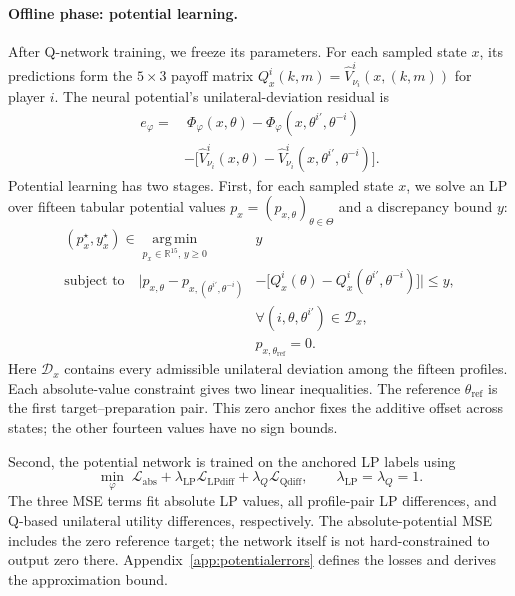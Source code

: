 \documentclass[pmlr]{jmlr}
\newcommand{\R}{\mathbb{R}}
\begin{document}
\paragraph{Offline phase: potential learning.}
After Q-network training, we freeze its parameters. For each sampled state $x$, its predictions form the $5\times3$ payoff matrix $Q_x^i(k,m)=\widehat V^i_{\nu_i}(x,(k,m))$ for player $i$. The neural potential's unilateral-deviation residual is
\begin{equation}
\begin{split}
 e_\varphi=&\ \Phi_\varphi(x,\theta)
       -\Phi_\varphi(x,\theta^{i\prime},\theta^{-i})\\
       &-\big[\widehat V^i_{\nu_i}(x,\theta)
       -\widehat V^i_{\nu_i}(x,\theta^{i\prime},\theta^{-i})\big].
\end{split}
 \label{eq:potentialresidual}
\end{equation}
Potential learning has two stages. First, for each sampled state $x$, we solve an LP over fifteen tabular potential values $p_x=(p_{x,\theta})_{\theta\in\Theta}$ and a discrepancy bound $y$:
\begin{equation}
\begin{aligned}
 (p_x^\star,y_x^\star)\in\operatorname*{arg\,min}_{p_x\in\R^{15},\,y\geq0}\;&y\\
 \text{subject to}\quad
 \big|p_{x,\theta}-p_{x,(\theta^{i\prime},\theta^{-i})}
 &-\big[Q_x^i(\theta)-Q_x^i(\theta^{i\prime},\theta^{-i})\big]\big|\leq y,\\
 &\forall(i,\theta,\theta^{i\prime})\in\mathcal D_x,\\
 &p_{x,\theta_{\mathrm{ref}}}=0.
\end{aligned}
 \label{eq:potentialtraining}
\end{equation}
Here $\mathcal D_x$ contains every admissible unilateral deviation among the fifteen profiles. Each absolute-value constraint gives two linear inequalities. The reference $\theta_{\mathrm{ref}}$ is the first target--preparation pair. This zero anchor fixes the additive offset across states; the other fourteen values have no sign bounds.

Second, the potential network is trained on the anchored LP labels using
\begin{equation}
 \min_\varphi\;
 \mathcal L_{\mathrm{abs}}
 +\lambda_{\mathrm{LP}}\mathcal L_{\mathrm{LPdiff}}
 +\lambda_Q\mathcal L_{\mathrm{Qdiff}},
 \qquad \lambda_{\mathrm{LP}}=\lambda_Q=1.
 \label{eq:potentialregression}
\end{equation}
The three MSE terms fit absolute LP values, all profile-pair LP differences, and Q-based unilateral utility differences, respectively. The absolute-potential MSE includes the zero reference target; the network itself is not hard-constrained to output zero there. Appendix~\ref{app:potentialerrors} defines the losses and derives the approximation bound.
\end{document}
